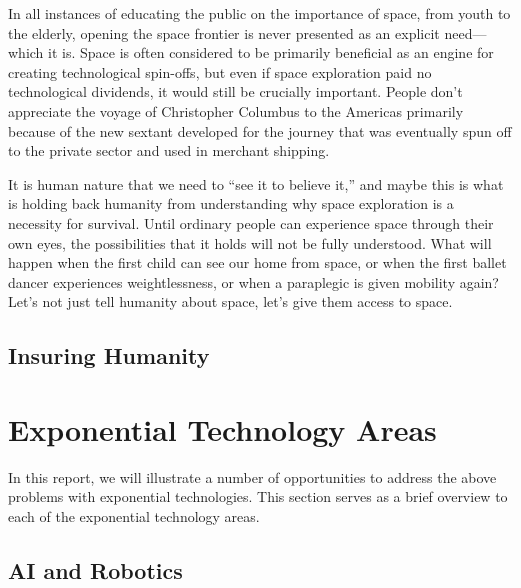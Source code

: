 \documentclass[letter,11pt]{article}
\begin{document}
In  all instances of educating the public on the importance of space, from  youth to the elderly, opening the space frontier is never presented as  an explicit need---which it is. Space is often considered to be  primarily beneficial as an engine for creating technological spin-offs,  but even if space exploration paid no technological dividends, it would  still be crucially important. People don't appreciate the voyage of  Christopher Columbus to the Americas primarily because of the new  sextant developed for the journey that was eventually spun off to the  private sector and used in merchant shipping.

It is human nature that we need to ``see it to believe it,'' and maybe this is what is holding back humanity  from understanding why space exploration is a necessity for survival.  Until ordinary people can experience space through their own eyes, the  possibilities that it holds will not be fully understood. What will  happen when the first child can see our home from space, or when the  first ballet dancer experiences weightlessness, or when a paraplegic is  given mobility again? Let's not just tell humanity about space, let's  give them access to space.


\subsection{Insuring Humanity}


\section{Exponential Technology Areas}
\label{et-overview}

In this report, we will illustrate a number of opportunities to address the
above problems with exponential technologies. This section serves as a brief
overview to each of the exponential technology areas.

\subsection{AI and Robotics}

\end{document}
